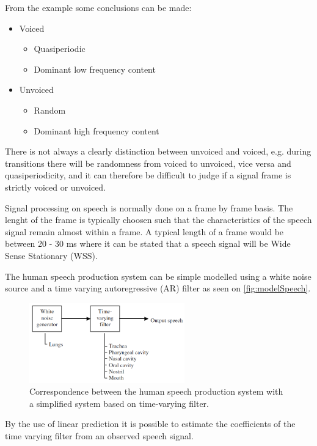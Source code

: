 From the example some conclusions can be made:
\begin{itemize}
\item Voiced
	\begin{itemize}
	\item Quasiperiodic
	\item Dominant low frequency content
	\end{itemize}
\item Unvoiced
	\begin{itemize}
	\item Random 
	\item Dominant high frequency content
	\end{itemize}
\end{itemize}


There is not always a clearly distinction between unvoiced and voiced, e.g. during transitions there will be randomness from voiced to unvoiced, vice versa and quasiperiodicity, and it can therefore be difficult to judge if a signal frame is strictly voiced or unvoiced. 

Signal processing on speech is normally done on a frame by frame basis. The lenght of the frame is typically choosen such that the characteristics of the speech signal remain almost within a frame. A typical length of a frame would be between 20 - 30 ms where it can be stated that a speech signal will be Wide Sense Stationary (WSS).  

The human speech production system can be simple modelled using a white noise source and a time varying autoregressive (AR) filter as seen on \autoref{fig:modelSpeech}. 

\begin{figure}[H]
	\centering
	\includegraphics[width=0.6\textwidth]{figures/Speech/modelSpeech}
	\caption{Correspondence between the human speech production system with a simplified system based on time-varying filter.}
	\label{fig:modelSpeech}
\end{figure}      

By the use of linear prediction it is possible to estimate the coefficients of the time varying filter from an observed speech signal. 